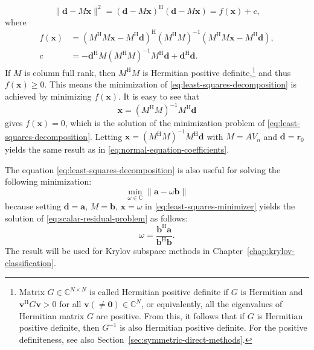 \begin{Proof}
\begin{equation}
\|\bm d-M\bm x\|^2=(\bm d-M\bm x)^{\mathrm H}(\bm d-M\bm x)=f(\bm x)+c,
\end{equation}
where
\[
\begin{aligned}
f(\bm x)&=(M^{\mathrm H}M\bm x-M^{\mathrm H}\bm d)^{\mathrm H}(M^{\mathrm H}M)^{-1}(M^{\mathrm H}M\bm x-M^{\mathrm H}\bm d),\\
c&=-\bm d^{\mathrm H}M(M^{\mathrm H}M)^{-1}M^{\mathrm H}\bm d+\bm d^{\mathrm H}\bm d.
\end{aligned}
\]
If $M$ is column full rank, then $M^{\mathrm H}M$ is Hermitian positive definite,\footnote{Matrix $G\in\mathbb C^{N\times N}$ is called Hermitian positive definite if $G$ is Hermitian and $\bm v^{\mathrm H}G\bm v>0$ for all $\bm v(\ne\bm 0)\in\mathbb C^N$, or equivalently, all the eigenvalues of Hermitian matrix $G$ are positive. From this, it follows that if $G$ is Hermitian positive definite, then $G^{-1}$ is also Hermitian positive definite. For the positive definiteness, see also Section~\ref{sec:symmetric-direct-methods}.} and thus $f(\bm x)\ge0$. This means the minimization of \eqref{eq:least-squares-decomposition} is achieved by minimizing $f(\bm x)$. It is easy to see that
\begin{equation}\label{eq:least-squares-minimizer}
\bm x=(M^{\mathrm H}M)^{-1}M^{\mathrm H}\bm d
\end{equation}
gives $f(\bm x)=0$, which is the solution of the minimization problem of \eqref{eq:least-squares-decomposition}.
Letting $\bm x=(M^{\mathrm H}M)^{-1}M^{\mathrm H}\bm d$ with $M=AV_n$ and $\bm d=\bm r_0$ yields the same result as in \eqref{eq:normal-equation-coefficients}.
\end{Proof}

\begin{Remark}\label{rem:scalar-residual-minimization}
The equation \eqref{eq:least-squares-decomposition} is also useful for solving the following minimization:
\begin{equation}\label{eq:scalar-residual-problem}
\min_{\omega\in\mathbb C}\|\bm a-\omega\bm b\|
\end{equation}
because setting $\bm d=\bm a$, $M=\bm b$, $\bm x=\omega$ in \eqref{eq:least-squares-minimizer} yields the solution of \eqref{eq:scalar-residual-problem} as follows:
\begin{equation}\label{eq:scalar-residual-minimizer}
\omega=\frac{\bm b^{\mathrm H}\bm a}{\bm b^{\mathrm H}\bm b}.
\end{equation}
The result will be used for Krylov subspace methods in Chapter~\ref{chap:krylov-classification}.
\end{Remark}

